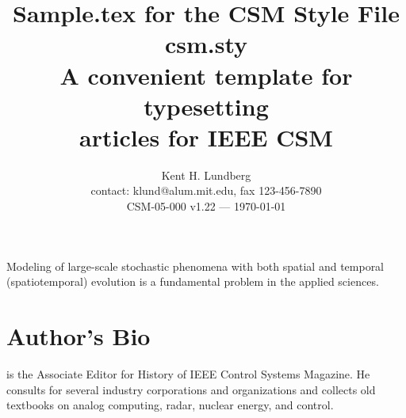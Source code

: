 \documentclass[letterpaper,12pt,peerreviewca,draftcls]{IEEEtran}
\title{Sample.tex for the CSM Style File csm.sty\\
A convenient template for typesetting\\
articles for IEEE CSM }
\author{Kent H. Lundberg \\
contact: klund@alum.mit.edu, fax 123-456-7890 \\
CSM-05-000 v1.22 --- \today}
\begin{document}
\maketitle
\CSMsetup

Modeling of large-scale stochastic phenomena with both spatial and temporal (spatiotemporal) evolution is a fundamental problem in the applied sciences.


\newpage

\clearpage
%
%

\section{Author's Bio}

 is the Associate Editor for History of
IEEE Control Systems Magazine.  He consults for several industry
corporations and organizations and collects old textbooks on analog
computing, radar, nuclear energy, and control.
\end{document}
